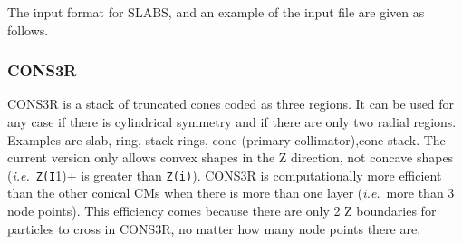 \documentclass[12pt,twoside]{article}
\newcommand{\ie}{{\em i.e.}}
\begin{document}
The input format for SLABS, and an example of the input file are given as
follows.

\begin{small}

\end{small}





\clearpage
\subsubsection{CONS3R}
\renewcommand{\rightmark}{CONS3R CM}
\label{sCONS3R}

CONS3R is a stack of truncated cones coded as three regions.  It can be used
for any case if there is cylindrical symmetry and if there are only two
radial regions. Examples are slab, ring, stack rings, cone (primary
collimator),cone stack. The current version only allows convex shapes in
the Z direction, not concave shapes (\ie\ \verb+Z(I+1)+ is greater than
\verb+Z(i)+).  CONS3R is computationally more efficient than the other
conical CMs when there is more than one layer (\ie\ more than 3 node
points). This efficiency comes because there are only 2 Z boundaries for
particles to cross in CONS3R, no matter how many node points there are.
\end{document}
